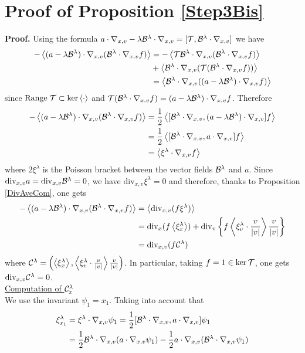 \documentclass[12pt, a4paper]{article}
\newcounter{steps}
\newenvironment{proof}[1][]{%
\par\medbreak\setcounter{steps}{0}
{\noindent\bfseries Proof#1. }} {\hfill\fbox{\ }\medbreak}
\newcommand{\xil}[0]{
\xi^\lambda}
\newcommand{\bl}[0]{
{\cal B}^\lambda}
\newcommand{\cl}[0]{
{\cal C} ^\lambda}
\newcommand{\Divx}[0]{
\mathrm{div}_x}
\newcommand{\Divv}[0]{
\mathrm{div}_v}
\newcommand{\Divxv}[0]{
\mathrm{div}_{x,v}}
\newcommand{\ran}[0]{
\mathrm{Range\;}}
\newcommand{\nxv}[0]{
\nabla_{x,v}}
\newcommand{\ave}[1]{
\left \langle #1 \right \rangle }
\begin{document}
\section{Proof of Proposition \ref{Step3Bis}}
\label{CLambda}
\begin{proof}
Using the formula $a \cdot \nxv - \lambda \bl \cdot \nxv = [{\cal T}, \bl \cdot \nxv ]$ we have
\begin{align*}
- \ave{(a - \lambda \bl) \cdot \nxv ( \bl \cdot \nxv f ) } & = - \ave{{\cal T} \bl \cdot \nxv ( \bl \cdot \nxv f ) } \\
& + \ave{\bl \cdot \nxv ( {\cal T} (\bl \cdot \nxv f ))} \\
& = \ave{\bl \cdot \nxv ( ( a - \lambda \bl ) \cdot \nxv f ) }
\end{align*}
since $\ran {\cal T} \subset \ker \ave{\cdot}$ and ${\cal T} ( \bl \cdot \nxv f ) = (a - \lambda \bl ) \cdot \nxv f$. Therefore
\begin{align*}
- \ave{(a - \lambda \bl) \cdot \nxv ( \bl \cdot \nxv f ) } & =\frac{1}{2} \ave{[\bl \cdot \nxv, (a - \lambda \bl ) \cdot \nxv ]f} \\
& = \frac{1}{2} \ave{[\bl \cdot \nxv, a \cdot \nxv ]f}\\
& = \ave{\xil \cdot \nxv f}
\end{align*}
where $2 \xil $ is the Poisson bracket between the vector fields $\bl$ and $a$. Since $\Divxv a = \Divxv \bl = 0$, we have $\Divxv \xil = 0$ and therefore, thanks to Proposition \ref{DivAveCom}, one gets
\begin{align*}
- \ave{(a - \lambda \bl) \cdot \nxv ( \bl \cdot \nxv f ) } & = \ave{\Divxv(f \xil)} \\
& = \Divx ( f \ave{\xil _x}) + \Divv \left \{ f  \ave{\xil _v \cdot \frac{v}{|v|}} \frac{v}{|v|} \right \}\\
& = \Divxv(f \cl)
\end{align*}
where $\cl = \left ( \ave{\xil _x},  \ave{\xil _v \cdot \frac{v}{|v|}} \frac{v}{|v|}\right )$. In particular, taking $f = 1 \in \ker {\cal T}$, one gets $\Divxv \cl = 0$. \\
\underline{Computation of $\cl _x$}\\
We use the invariant $\psi _1 = x_1$. Taking into account that 
\begin{align*}
\xil _{x_1} & = \xil \cdot \nxv \psi _1 = \frac{1}{2} [\bl \cdot \nxv, a \cdot \nxv ]\psi _1 \\
& = \frac{1}{2} \bl \cdot \nxv ( a \cdot \nxv \psi _1) - \frac{1}{2} a \cdot \nxv ( \bl \cdot \nxv \psi _1 ) \\

\end{align*}
\end{proof}
\end{document}
